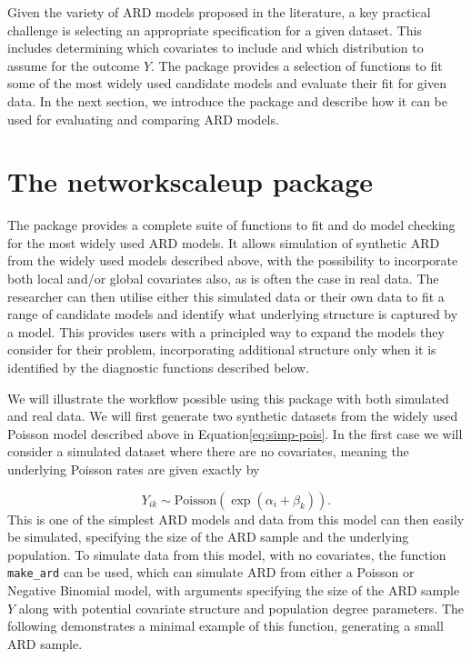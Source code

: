 Given the variety of ARD models proposed in the literature, a key practical
challenge is selecting an appropriate specification for a given dataset. This
includes determining which covariates to include and which
distribution to assume
for the outcome \(Y\). The  package
provides a selection of functions to fit some of the
most widely used candidate models and
evaluate their fit for given data. In the next section, we
introduce the  package and
describe how it can be used for evaluating and
comparing ARD models.

\hypertarget{sec:package}{%
\section{The networkscaleup package}\label{sec:package}}

The  package provides a complete suite of
functions to fit and do model checking for
the most widely used ARD models.
It allows simulation of synthetic ARD from the widely used models described
above, with the possibility to incorporate both local and/or
global covariates also, as is often the case in real data.
The researcher can then utilise either this simulated data or their
own data to fit a range of candidate models and identify
what underlying structure is captured by a model. This provides users with
a principled way to expand the models they consider for their problem,
incorporating additional structure only when it is identified by the
diagnostic functions described below.

We will illustrate the workflow possible using this package
with both simulated and real data.
We will
first generate two synthetic datasets from the widely used Poisson
model described above in Equation\eqref{eq:simp-pois}.
In the first case we will
consider a simulated dataset where there are no covariates, meaning
the underlying Poisson rates are given exactly by

\[
Y_{ik}\sim \text{Poisson}(\exp(\alpha_i + \beta_k)).
\]
This is one of the simplest ARD models and
data from this model can then easily be simulated, specifying the size
of the ARD sample and the underlying population.
To simulate data from this model, with no covariates, the
function \texttt{make\_ard} can be used, which can simulate ARD from either
a Poisson or Negative Binomial model, with arguments specifying the size
of the ARD sample \(Y\) along with potential covariate structure
and population degree parameters. The following demonstrates a
minimal example of this function, generating a small ARD sample.

